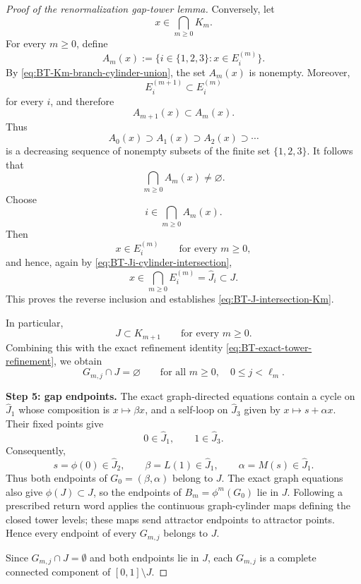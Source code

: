 \documentclass[11pt]{amsart}
\theoremstyle{plain}
\theoremstyle{definition}
\theoremstyle{remark}
\begin{document}
\begin{proof}[Proof of the renormalization gap-tower lemma]
Conversely, let
\[
        x\in\bigcap_{m\geq0}K_m.
\]
For every \(m\geq0\), define
\[
        A_m(x)
        :=
        \bigl\{
        i\in\{1,2,3\}:
        x\in E_i^{(m)}
        \bigr\}.
\]
By \eqref{eq:BT-Km-branch-cylinder-union}, the set \(A_m(x)\) is
nonempty. Moreover,
\[
        E_i^{(m+1)}\subset E_i^{(m)}
\]
for every \(i\), and therefore
\[
        A_{m+1}(x)\subset A_m(x).
\]
Thus
\[
        A_0(x)\supset A_1(x)\supset A_2(x)\supset\cdots
\]
is a decreasing sequence of nonempty subsets of the finite set
\(\{1,2,3\}\). It follows that
\[
        \bigcap_{m\geq0}A_m(x)\neq\varnothing.
\]
Choose
\[
        i\in\bigcap_{m\geq0}A_m(x).
\]
Then
\[
        x\in E_i^{(m)}
        \qquad\text{for every }m\geq0,
\]
and hence, again by \eqref{eq:BT-Ji-cylinder-intersection},
\[
        x\in
        \bigcap_{m\geq0}E_i^{(m)}
        =
        \widehat J_i
        \subset J.
\]
This proves the reverse inclusion and establishes
\eqref{eq:BT-J-intersection-Km}.

In particular,
\[
        J\subset K_{m+1}
        \qquad\text{for every }m\geq0.
\]
Combining this with the exact refinement identity
\eqref{eq:BT-exact-tower-refinement}, we obtain
\[
        G_{m,j}\cap J=\varnothing
        \qquad
        \text{for all }
        m\geq0,\quad 0\leq j<\ell_m.
\]

\smallskip
\noindent
\textbf{Step 5: gap endpoints.}
The exact graph-directed equations contain a cycle on \(\widehat J_1\) whose composition is
\(x\mapsto\beta x\), and a self-loop on \(\widehat J_3\) given by
\(x\mapsto s+\alpha x\). Their fixed points give
\[
        0\in\widehat J_1,
        \qquad
        1\in\widehat J_3.
\]
Consequently,
\[
        s=\phi(0)\in\widehat J_2,
        \qquad
        \beta=L(1)\in\widehat J_1,
        \qquad
        \alpha=M(s)\in\widehat J_1.
\]
Thus both endpoints of \(G_0=(\beta,\alpha)\) belong to \(J\). The exact graph equations
also give \(\phi(J)\subset J\), so the endpoints of \(B_m=\phi^m(G_0)\) lie in \(J\).
Following a prescribed return word applies the continuous graph-cylinder maps defining the
closed tower levels; these maps send attractor endpoints to attractor points. Hence every
endpoint of every \(G_{m,j}\) belongs to \(J\).

Since \(G_{m,j}\cap J=\emptyset\) and both endpoints lie in \(J\), each \(G_{m,j}\) is a
complete connected component of \([0,1]\setminus J\).


\end{proof}
\end{document}
